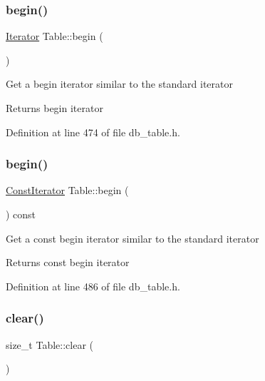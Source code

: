 \subsubsection{\texorpdfstring{begin()}{begin()}\hspace{0.1cm}{\footnotesize\ttfamily [1/2]}}
{\footnotesize\ttfamily \hyperlink{class_table_1_1_iterator_impl}{Iterator} Table\+::begin (\begin{DoxyParamCaption}{ }\end{DoxyParamCaption})\hspace{0.3cm}{\ttfamily [inline]}}

Get a begin iterator similar to the standard iterator \begin{DoxyReturn}{Returns}
begin iterator 
\end{DoxyReturn}


Definition at line 474 of file db\+\_\+table.\+h.

\mbox{\label{class_table_a8b9f35b26e064b9104afcdc804e05883}} 
\subsubsection{\texorpdfstring{begin()}{begin()}\hspace{0.1cm}{\footnotesize\ttfamily [2/2]}}
{\footnotesize\ttfamily \hyperlink{class_table_1_1_iterator_impl}{Const\+Iterator} Table\+::begin (\begin{DoxyParamCaption}{ }\end{DoxyParamCaption}) const\hspace{0.3cm}{\ttfamily [inline]}}

Get a const begin iterator similar to the standard iterator \begin{DoxyReturn}{Returns}
const begin iterator 
\end{DoxyReturn}


Definition at line 486 of file db\+\_\+table.\+h.

\mbox{\label{class_table_af94164c4dde76690be6b7f3a1d5e7733}} 
\subsubsection{\texorpdfstring{clear()}{clear()}}
{\footnotesize\ttfamily size\+\_\+t Table\+::clear (\begin{DoxyParamCaption}{ }\end{DoxyParamCaption})\hspace{0.3cm}{\ttfamily [inline]}}

